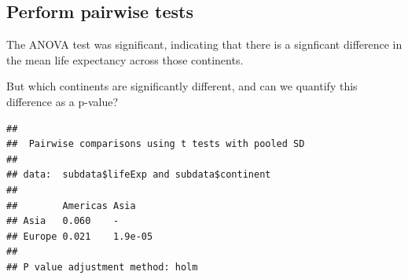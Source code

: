 \documentclass[]{book}
\makeatletter
\newenvironment{Shaded}{\begin{snugshade}}{\end{snugshade}}
\newcommand{\CommentTok}[1]{\textcolor[rgb]{0.56,0.35,0.01}{\textit{#1}}}
\newcommand{\DataTypeTok}[1]{\textcolor[rgb]{0.13,0.29,0.53}{#1}}
\newcommand{\DecValTok}[1]{\textcolor[rgb]{0.00,0.00,0.81}{#1}}
\newcommand{\KeywordTok}[1]{\textcolor[rgb]{0.13,0.29,0.53}{\textbf{#1}}}
\newcommand{\NormalTok}[1]{#1}
\newcommand{\OperatorTok}[1]{\textcolor[rgb]{0.81,0.36,0.00}{\textbf{#1}}}
\newcommand{\StringTok}[1]{\textcolor[rgb]{0.31,0.60,0.02}{#1}}
\newenvironment{kframe}{%
\medskip{}
\setlength{\fboxsep}{.8em}
 \def\at@end@of@kframe{}%
 \ifinner\ifhmode%
  \def\at@end@of@kframe{\end{minipage}}%
  \begin{minipage}{\columnwidth}%
 \fi\fi%
 \def\FrameCommand##1{\hskip\@totalleftmargin \hskip-\fboxsep
 \colorbox{shadecolor}{##1}\hskip-\fboxsep
     \hskip-\linewidth \hskip-\@totalleftmargin \hskip\columnwidth}%
 \MakeFramed {\advance\hsize-\width
   \@totalleftmargin\z@ \linewidth\hsize
   \@setminipage}}%
 {\par\unskip\endMakeFramed%
 \at@end@of@kframe}
\renewenvironment{Shaded}{\begin{kframe}}{\end{kframe}}
\theoremstyle{definition}
\theoremstyle{definition}
\theoremstyle{definition}
\theoremstyle{remark}
\makeatother
\begin{document}
\hypertarget{perform-pairwise-tests}{%
\subsection{Perform pairwise tests}\label{perform-pairwise-tests}}

The ANOVA test was significant, indicating that there is a signficant
difference in the mean life expectancy across those continents.

But which continents are significantly different, and can we quantify
this difference as a p-value?

\begin{Shaded}
\end{Shaded}

\begin{verbatim}
## 
##  Pairwise comparisons using t tests with pooled SD 
## 
## data:  subdata$lifeExp and subdata$continent 
## 
##        Americas Asia   
## Asia   0.060    -      
## Europe 0.021    1.9e-05
## 
## P value adjustment method: holm
\end{verbatim}

\begin{Shaded}
\end{Shaded}
\end{document}
